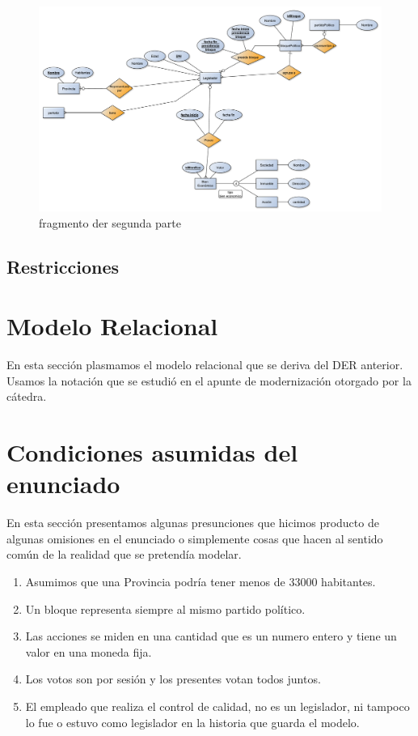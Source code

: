 \documentclass[10pt, a4paper]{article}
\begin{document}
		\begin{figure}[ht]
		    \includegraphics[scale=.30]{./imagenes/DERParteDeArriba.pdf}
		    \caption{fragmento der segunda parte} 
		    \label{fig:derparte2}
		\end{figure}

	\newpage
	\subsection{Restricciones}
	
		

\section{Modelo Relacional}

En esta secci\'on plasmamos el modelo relacional que se deriva del DER anterior. Usamos la notaci\'on que se estudi\'o en el apunte de modernizaci\'on otorgado por la c\'atedra.

	

\section{Condiciones asumidas del enunciado}

En esta secci\'on presentamos algunas presunciones que hicimos producto de algunas omisiones en el enunciado o simplemente cosas que hacen al sentido com\'un de la realidad que se pretend\'ia modelar.

\begin{enumerate}
	\item Asumimos que una Provincia podr\'ia tener menos de 33000 habitantes.

	\item Un bloque representa siempre al mismo partido pol\'itico.
	\item Las acciones se miden en una cantidad que es un numero entero y tiene un valor en una moneda fija.
	\item Los votos son por sesi\'on y los presentes votan todos juntos. 
	\item El empleado que realiza el control de calidad, no es un legislador, ni tampoco lo fue o estuvo como legislador en la historia que guarda el modelo.	
\end{enumerate}
\end{document}
